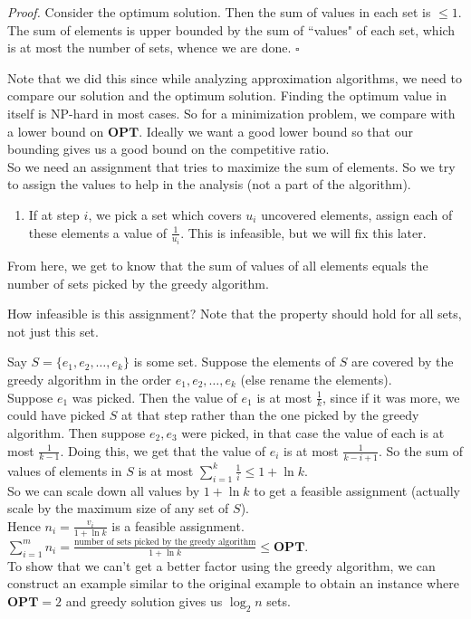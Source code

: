 \documentclass[a4paper]{article}
\newenvironment{proof}{\begin{breakbox}\textit{Proof.}}{\hfill$\square$\end{breakbox}}
\newcommand{\nl}{\vspace{0.2cm}\\}
\newcommand{\OPT}{\mathbf{OPT}}
\begin{document}
\begin{proof}
    Consider the optimum solution. Then the sum of values in each set is $\le 1$. The sum of elements is upper bounded by the sum of ``values" of each set, which is at most the number of sets,
    whence we are done.
\end{proof}

Note that we did this since while analyzing approximation algorithms, we need to compare our solution and the optimum solution. Finding the optimum value in itself is NP-hard in most cases.
So for a minimization problem, we compare with a lower bound on $\OPT$. Ideally we want a good lower bound so that our bounding gives us a good bound on the competitive ratio.\nl
So we need an assignment that tries to maximize the sum of elements. So we try to assign the values to help in the analysis (not a part of the algorithm).\nl

\begin{enumerate}
    \item If at step $i$, we pick a set which covers $u_i$ uncovered elements, assign each of these elements a value of $\frac{1}{u_i}$. This is infeasible, but we will fix this later.
\end{enumerate}

From here, we get to know that the sum of values of all elements equals the number of sets picked by the greedy algorithm.\nl

\begin{ques}
How infeasible is this assignment? Note that the property should hold for all sets, not just this set.
\end{ques}

Say $S = \{e_1, e_2, \ldots, e_k\}$ is some set. Suppose the elements of $S$ are covered by the greedy algorithm in the order $e_1, e_2, \ldots, e_k$ (else rename the elements).\nl
Suppose $e_1$ was picked. Then the value of $e_1$ is at most $\frac{1}{k}$, since if it was more, we could have picked $S$ at that step rather than the one picked by the greedy algorithm. Then
suppose $e_2, e_3$ were picked, in that case the value of each is at most $\frac{1}{k-1}$. Doing this, we get that the value of $e_i$ is at most $\frac{1}{k - i + 1}$. So the sum of values of
elements in $S$ is at most $\sum_{i=1}^k\frac{1}{i} \le 1 + \ln k$.\nl
So we can scale down all values by $1 + \ln k$ to get a feasible assignment (actually scale by the maximum size of any set of $S$).\nl
Hence $n_i = \frac{v_i}{1 + \ln k}$ is a feasible assignment.\nl
$\sum_{i = 1}^m n_i = \frac{\text{number of sets picked by the greedy algorithm}}{1 + \ln k} \le \OPT$.\nl

To show that we can't get a better factor using the greedy algorithm, we can construct an example similar to the original example to obtain an instance where $\OPT = 2$ and greedy solution gives us $\log_2 n$ sets.
\end{document}
